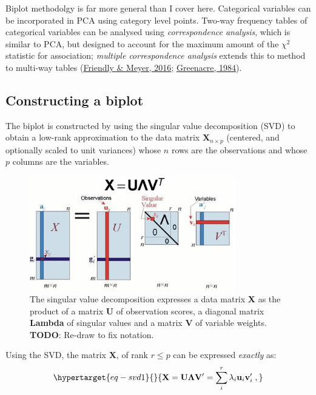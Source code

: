 \documentclass[
  letterpaper,
  10pt,
  krantz2]{krantz}
\begin{document}
Biplot methodolgy is far more general than I cover here. Categorical
variables can be incorporated in PCA using category level points.
Two-way frequency tables of categorical variables can be analysed using
\emph{correspondence analysis}, which is similar to PCA, but designed to
account for the maximum amount of the \(\chi^2\) statistic for
association; \emph{multiple correspondence analysis} extends this to
method to multi-way tables
(\protect\hyperlink{ref-FriendlyMeyer:2016:DDAR}{Friendly \& Meyer,
2016}; \protect\hyperlink{ref-Greenacre:84}{Greenacre, 1984}).

\hypertarget{constructing-a-biplot}{%
\subsection{Constructing a biplot}\label{constructing-a-biplot}}

The biplot is constructed by using the singular value decomposition
(SVD) to obtain a low-rank approximation to the data matrix
\(\mathbf{X}_{n \times p}\) (centered, and optionally scaled to unit
variances) whose \(n\) rows are the observations and whose \(p\) columns
are the variables.

\begin{figure}

{\centering \includegraphics[width=0.8\textwidth,height=\textheight]{images/SVD-eqn.jpg}

}

\caption{\label{fig-svd-diagram}The singular value decomposition
expresses a data matrix \textbf{X} as the product of a matrix \textbf{U}
of observation scores, a diagonal matrix \textbf{Lambda} of singular
values and a matrix \textbf{V} of variable weights. \textbf{TODO}:
Re-draw to fix notation.}

\end{figure}

Using the SVD, the matrix \(\mathbf{X}\), of rank \(r \le p\) can be
expressed \emph{exactly} as:
\begin{equation}\protect\hypertarget{eq-svd1}{}{
\mathbf{X} = \mathbf{U} \mathbf{\Lambda} \mathbf{V}'
                 = \sum_i^r \lambda_i \mathbf{u}_i \mathbf{v}_i' \; ,
}\label{eq-svd1}\end{equation}
\end{document}
